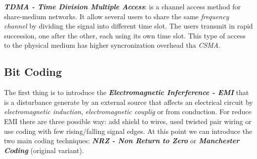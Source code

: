 \textbf{\textit{TDMA - Time Division Multiple Access}}: is a channel access method for share-medium networks. It allow several users to share the same \textit{frequency channel} by dividing the signal into different time slot. The users transmit in rapid succession, one after the other, each using its own time slot. This type of access to the physical medium has higher syncronization overhead tha \textit{CSMA}.

\subsection{Bit Coding}
The first thing is to introduce the \textbf{\textit{Electromagnetic Inferference - EMI}} that is a disturbance generate by an external source that affects an electrical circuit by \textit{electromagnetic induction}, \textit{electromagnetic couplig} or from conduction. For reduce EMI there are three possible way: add shield to wires, used twisted pair wiring or use coding with few rising/falling signal edges. At this point we can introduce the two main coding techniques: \textbf{\textit{NRZ - Non Return to Zero}} or \textbf{\textit{Manchester Coding}} (original variant).
